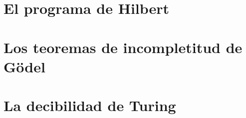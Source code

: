 \documentclass{scrbook}
\begin{document}
\frontmatter %


                    
                     
   
            


                    
               

\mainmatter %

\setpartpreamble[c][0.75\linewidth]{%
	\bigskip %
}
\part{El programa de Hilbert} %



\setpartpreamble[c][0.75\linewidth]{%
	\bigskip %
}

\part{Los teoremas de incompletitud de Gödel}



\setpartpreamble[c][0.75\linewidth]{%
	\bigskip %
}

\part{La decibilidad de Turing}
\end{document}
